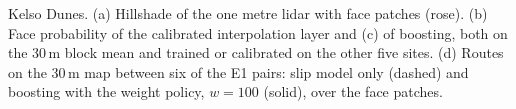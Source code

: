 Kelso Dunes. (a) Hillshade of the one metre lidar with face patches (rose). (b) Face probability of the calibrated interpolation layer and (c) of boosting, both on the 30\,m block mean and trained or calibrated on the other five sites. (d) Routes on the 30\,m map between six of the E1 pairs: slip model only (dashed) and boosting with the weight policy, $w=100$ (solid), over the face patches.

